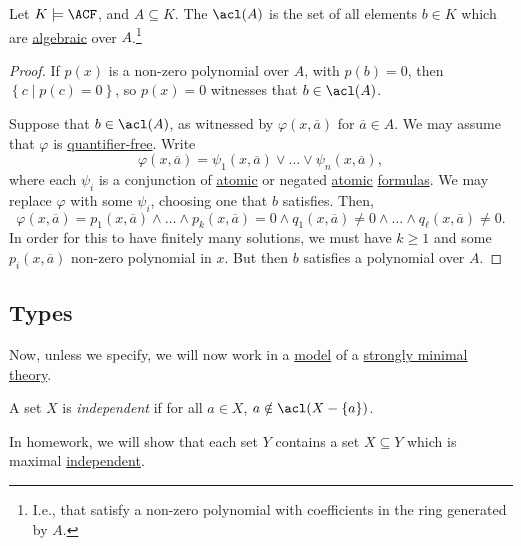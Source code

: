 \begin{theorem}
	Let \(K \models \ACF\), and \(A \subseteq K\). The \(\acl(A)\)  is the set of all elements \(b\in K\) which are \hyperref[def:algebraic]{algebraic} over \(A\).\footnote{I.e., that satisfy a non-zero polynomial with coefficients in the ring generated by \(A\).}
\end{theorem}
\begin{proof}
	If \(p(x)\) is a non-zero polynomial over \(A\), with \(p(b) = 0\), then \(\left\{ c \mid p(c) = 0 \right\} \), so \(p(x) = 0\) witnesses that \(b\in \acl(A)\).

	Suppose that \(b\in \acl(A)\), as witnessed by \(\varphi (x, \overline{a} )\) for \(\overline{a} \in A\). We may assume that \(\varphi \) is \hyperref[not:quantifier-free]{quantifier-free}. Write
	\[
		\varphi (x, \overline{a} ) = \psi _1(x, \overline{a} ) \lor \ldots \lor \psi _n(x, \overline{a} ),
	\]
	where each \(\psi _i\) is a conjunction of \hyperref[not:atomic]{atomic} or negated \hyperref[not:atomic]{atomic} \hyperref[def:formula]{formulas}. We may replace \(\varphi \) with some \(\psi _i\), choosing one that \(b\) satisfies. Then,
	\[
		\varphi (x, \overline{a} ) = p_1(x, \overline{a} ) \land \ldots \land p_k(x, \overline{a} ) = 0 \land q_1(x, \overline{a} ) \neq 0 \land \ldots \land q_{\ell}(x, \overline{a} ) \neq 0.
	\]
	In order for this to have finitely many solutions, we must have \(k \geq 1\) and some \(p_i(x, \overline{a} )\) non-zero polynomial in \(x\). But then \(b\) satisfies a polynomial over \(A\).
\end{proof}

\subsection{Types}
Now, unless we specify, we will now work in a \hyperref[def:model]{model} of a \hyperref[def:strongly-minimal]{strongly minimal} \hyperref[def:theory]{theory}.

\begin{definition}[Independent]\label{def:independent}
	A set \(X\) is \emph{independent} if for all \(a\in X\), \(a \notin \acl(X - \left\{ a \right\} )\).
\end{definition}

\begin{remark}
	In homework, we will show that each set \(Y\) contains a set \(X \subseteq Y\) which is maximal \hyperref[def:independent]{independent}.
\end{remark}

